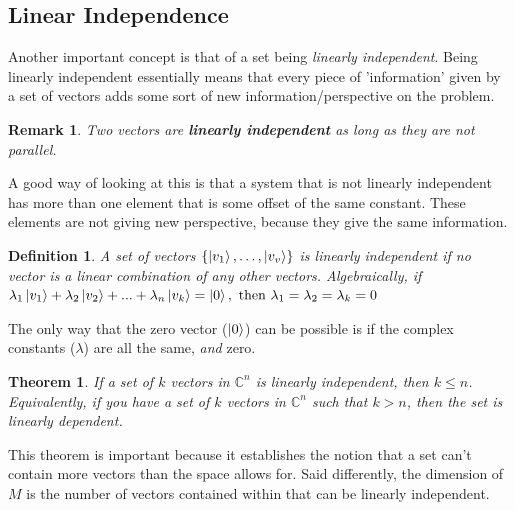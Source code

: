 \documentclass[12pt]{article}
\theoremstyle{plain}
\newtheorem{theorem}[lemma]{Theorem}
\theoremstyle{nonumberplain}
\theoremstyle{plain}
\newtheorem{definition}[lemma]{Definition}
\newtheorem{remark}[lemma]{Remark}
\theoremstyle{nonumberplain}
\newcommand\1{{\bf 1}}
\newcommand{\setovecs}[1]{\lb \ket{v_1}, \ldots, \ket{v_{#1}}\rb} %
\newcommand{\C}{\mathbb{C}} %
\newcommand{\<}{\left\langle}
\renewcommand{\>}{\right\rangle}
\newcommand{\lb}{\left\{}
\newcommand{\rb}{\right\}}
\begin{document}
\subsection{Linear Independence}
Another important concept is that of a set being \textit{linearly independent}. Being linearly independent essentially means that every piece of 'information' given by a set of vectors adds some sort of new information/perspective on the problem.

\begin{remark}
Two vectors are \textbf{linearly independent} as long as they are not \textit{parallel}.
\end{remark}

A good way of looking at this is that a system that is not linearly independent has more than one element that is some offset of the same constant. These elements are not giving new perspective, because they give the same information.

\begin{definition}
A set of vectors $\setovecs{v}$ is linearly independent if no vector is a linear combination of any other vectors. Algebraically, if $\lambda_1\ket{v_1} + \lambda_2\ket{v_2} + ... + \lambda_n\ket{v_k}=\ket{0}, \text{ then } \lambda_1=\lambda_2=\lambda_k=0$
\end{definition}

The only way that the zero vector ($\ket{0}$) can be possible is if the complex constants ($\lambda$) are all the same, \textit{and} zero.

\begin{theorem}
If a set of $k$ vectors in $\C^n$ is linearly independent, then $k \leq n$. Equivalently, if you have a set of $k$ vectors in $\C^n$ such that $k>n$, then the set is linearly dependent.
\end{theorem}

This theorem is important because it establishes the notion that a set can't contain more vectors than the space allows for. Said differently, the dimension of $M$ is the number of vectors contained within that can be linearly independent.

\end{document}
